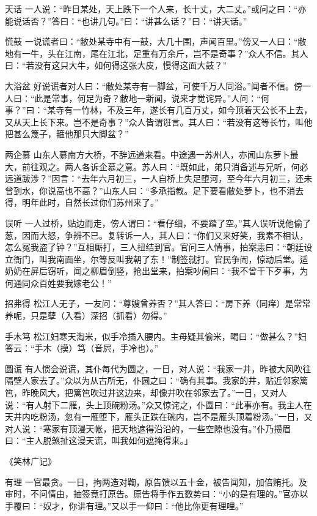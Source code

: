 \documentclass[12pt,UTF8]{ctexbook}
\begin{document}
天话
一人说：“昨日某处，天上跌下一个人来，长十丈，大二丈。”或问之曰：“亦能说话否？”答曰：“也讲几句。”曰：“讲甚么话？”曰：“讲天话。”

慌鼓
一说谎者曰：“敝处某寺中有一鼓，大几十围，声闻百里。”傍又一人曰：“敝地有一牛，头在江南，尾在江北，足重有万余斤，岂不是奇事？”众人不信。其人曰：“若没有这只大牛，如何得这张大皮，慢得这面大鼓？”

大浴盆
好说谎者对人曰：“敝处某寺有一脚盆，可使千万人同浴。”闻者不信。傍一人曰：“此是常事，何足为奇？敝地一新闻，说来才觉诧异。”人问：“何事？”曰：“某寺有一竹林，不及三年，遂长有几百万丈，如今顶着天公长不上去，又从天上长下来。岂不是奇事？”众人皆谓诳言。其人曰：“若没有这等长竹，叫他把甚么篾子，箍他那只大脚盆？”

两企慕
山东人慕南方大桥，不辞远道来看。中途遇一苏州人，亦闻山东萝卜最大，前往观之。两人各诉企慕之意。苏人曰：“既如此，弟只消备述与兄听，何必远道跋涉？”因言：“去年六月初三，一人自桥上失足堕河，至今年六月初三，还未曾到水，你说高也不高？”山东人曰：“多承指教。足下要看敝处萝卜，也不消去得，明年此时，自然长过你们苏州来了。”

误听
一人过桥，贴边而走，傍人谓曰：“看仔细，不要踏了空。”其人误听说他偷了葱，因而大怒，争辨不已。复转诉一人，其人曰：“你们又来好笑，我素不相认，怎么冤我盗了钟？”互相厮打，三人扭结到官。官问三人情事，拍案恚曰：“朝廷设立衙门，叫我南面坐，尔等反叫我朝了东！”制签就打。官民争闹，惊动后堂。适奶奶在屏后窃听，闻之柳眉倒竖，抢出堂来，拍案吵闹曰：“我不曾干下歹事，为何通同众百姓要我嫁老公！”

招弗得
松江人无子，一友问：“尊嫂曾养否？”其人答曰：“房下养（同痒）是常常养呢，只是孽（入看）深招（抓看）勿得。”

手木笃
松江妇寒天淘米，似手冷插入腰内。主母疑其偷米，喝曰：“做甚么？”妇答云：“手木（摸）笃（音屄，手冷也）。”

圆谎
有人惯会说谎，其仆每代为圆之，一日，对人说：“我家一井，昨被大风吹往隔壁人家去了。”众以为从古所无，仆圆之曰：“确有其事。我家的井，贴近邻家篱笆，昨晚风大，把篱笆吹过井这边来，却像井吹在邻家去了。”一日，又对人说：“有人射下二雁，头上顶碗粉汤。”众又惊诧之，仆圆曰：“此事亦有。我主人在天井内吃粉汤，忽有一雁堕下，雁头正跌在碗内，岂不是雁头顶着粉汤。”一日，又对人说：“寒家有顶漫天帐，把天地遮得沿沿的，一些空隙也没有。”仆乃攒眉曰：“主人脱煞扯这漫天谎，叫我如何遮掩得来。」

\backmatter
《笑林广记》

有理
一官最贪。一日，拘两造对鞫，原告馈以五十金，被告闻知，加倍贿托。及审时，不问情由，抽签竟打原告。原告将手作五数势曰：“小的是有理的。”官亦以手覆曰：“奴才，你讲有理。”又以手一仰曰：“他比你更有理哩。”
\end{document}
